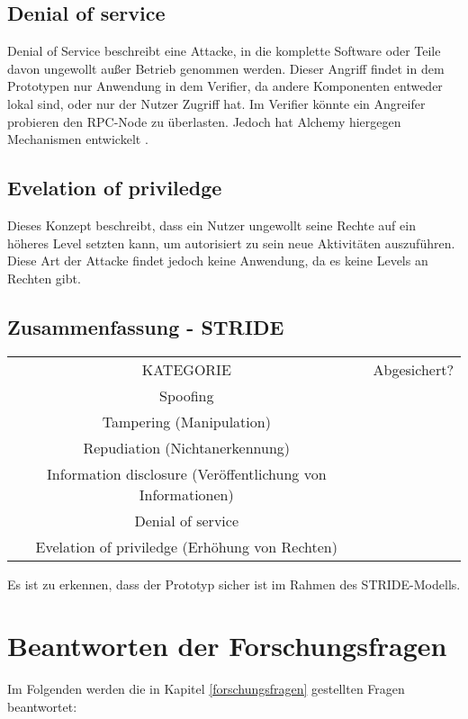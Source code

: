 \subsection{Denial of service}
Denial of Service beschreibt eine Attacke, in die komplette Software oder Teile davon ungewollt außer Betrieb genommen werden. Dieser Angriff findet in dem Prototypen nur Anwendung in dem Verifier, da andere Komponenten entweder lokal sind, oder nur der Nutzer Zugriff hat. Im Verifier könnte ein Angreifer probieren den RPC-Node zu überlasten. Jedoch hat Alchemy hiergegen Mechanismen entwickelt \cite{ID61}.

\subsection{Evelation of priviledge}
Dieses Konzept beschreibt, dass ein Nutzer ungewollt seine Rechte auf ein höheres Level setzten kann, um autorisiert zu sein neue Aktivitäten auszuführen. Diese Art der Attacke findet jedoch keine Anwendung, da es keine Levels an Rechten gibt.

\subsection{Zusammenfassung - STRIDE}
\begin{center}
	\begin{tabular}{ c c }
		KATEGORIE & Abgesichert? \\
		Spoofing & \checkmark \\
		Tampering (Manipulation) & \checkmark \\
		Repudiation (Nichtanerkennung) & \checkmark\\
		Information disclosure (Veröffentlichung von Informationen) &\checkmark\\
		Denial of service & \checkmark\\
		Evelation of priviledge (Erhöhung von Rechten) & \checkmark \\
	\end{tabular}
\end{center}
Es ist zu erkennen, dass der Prototyp sicher ist im Rahmen des STRIDE-Modells.

\section{Beantworten der Forschungsfragen}
Im Folgenden werden die in Kapitel \ref{forschungsfragen} gestellten Fragen beantwortet:



